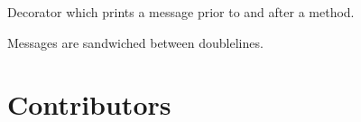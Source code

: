 \documentclass[letterpaper,10pt,english]{sphinxmanual}
\begin{document}

\begin{fulllineitems}
\label{\detokenize{references/misc:nmrespy._misc.start_end_wrapper}}
\sphinxAtStartPar
Decorator which prints a message prior to and after a method.

\sphinxAtStartPar
Messages are sandwiched between double\sphinxhyphen{}lines.

\end{fulllineitems}





\chapter{Contributors}
\label{\detokenize{contributors:contributors}}\label{\detokenize{contributors::doc}}
\end{document}
